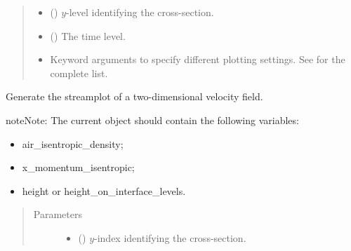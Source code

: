 \documentclass[letterpaper,10pt,english]{sphinxmanual}
\begin{document}
\begin{fulllineitems}
\begin{fulllineitems}
\begin{quote}
\begin{description}
\begin{itemize}
\item {} 
 () \textendash{} \(y\)-level identifying the cross-section.

\item {} 
 () \textendash{} The time level.

\item {} 
 \textendash{} Keyword arguments to specify different plotting settings.
See {\hyperref[\detokenize{api:tasmania.utils.utils_plot.quiver_xz}]{}} for the complete list.

\end{itemize}

\end{description}\end{quote}

\end{fulllineitems}


\begin{fulllineitems}
\label{\detokenize{api:storages.state_isentropic.StateIsentropic.streamplot_xz}}
Generate the streamplot of a two-dimensional velocity field.

\begin{sphinxadmonition}{note}{Note:}
The current object should contain the following variables:
\begin{itemize}
\item {} 
air\_isentropic\_density;

\item {} 
x\_momentum\_isentropic;

\item {} 
height or height\_on\_interface\_levels.

\end{itemize}
\end{sphinxadmonition}
\begin{quote}\begin{description}
\item[{Parameters}] \leavevmode\begin{itemize}
\item {} 
 () \textendash{} \(y\)-index identifying the cross-section.


\end{itemize}
\end{description}
\end{quote}
\end{fulllineitems}
\end{fulllineitems}
\end{document}

